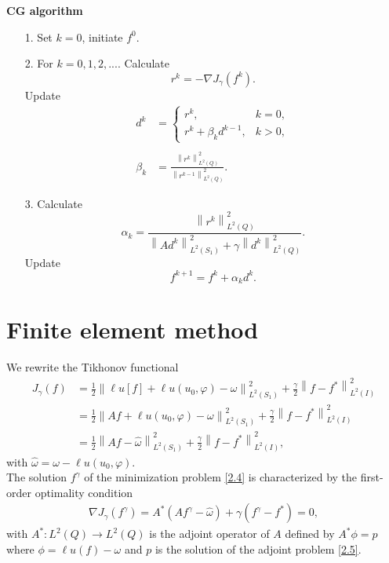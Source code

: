 \documentclass[]{article}
\begin{document}
\noindent \textbf{CG algorithm}
\begin{itemize}
	\item[1.] Set $k=0$, initiate $f^0$.
	\item[2.] For $k=0, 1, 2,...$. Calculate
	$$r^k=-\nabla J_\gamma(f^k).$$
	Update\\
	\begin{align*}
		d^k&=\left\{\begin{array}{ll}
		r^k,& k=0,\\
		r^k+\beta_kd^{k-1},& k>0,
		\end{array}\right.\\\\
		\beta_k&=\frac{\left\|r^k\right\|^2_{L^2(Q)}}{\left\|r^{k-1}\right\|^2_{L^2(Q)}}.
	\end{align*}
	\item[3.] Calculate
	$$\alpha_k=\frac{\left\|r^k\right\|^2_{L^2(Q)}}{\left\|Ad^k\right\|^2_{L^2(S_1)}+\gamma\left\|d^k\right\|^2_{L^2(Q)}}.$$
	Update
	$$f^{k+1}=f^{k}+\alpha_kd^k.$$
\end{itemize}

\section{Finite element method}
We rewrite the Tikhonov functional
\begin{align*}
	J_\gamma(f)&=\frac{1}{2}\left\|\ell u[f]+\ell u(u_0, \varphi)-\omega\right\|^2_{L^2(S_1)}+\frac{\gamma}{2}\left\|f-f^*\right\|^2_{L^2(I)}\\
	&=\frac{1}{2}\left\|Af+\ell u(u_0, \varphi)-\omega\right\|^2_{L^2(S_1)}+\frac{\gamma}{2}\left\|f-f^*\right\|^2_{L^2(I)}\\
	&=\frac{1}{2}\left\|Af-\hat{\omega}\right\|^2_{L^2(S_1)}+\frac{\gamma}{2}\left\|f-f^*\right\|^2_{L^2(I)},
\end{align*}
with $\hat{\omega}=\omega-\ell u(u_0, \varphi)$.
\\
The solution $f^\gamma$ of the minimization problem \eqref{2.4} is characterized by the first-order optimality condition
\begin{align}\label{3.1}
	\nabla J_\gamma(f^\gamma)= A^*(Af^\gamma-\hat{\omega})+\gamma(f^\gamma-f^*)=0,
\end{align}
with $A^*: L^2(Q)\to L^2(Q)$ is the adjoint operator of $A$ defined by $A^*\phi = p$ where $\phi = \ell u(f) - \omega$ and $p$ is the solution of the adjoint problem \eqref{2.5}. 
\end{document}
